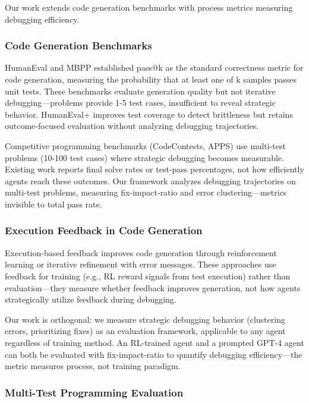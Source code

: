 
Our work extends code generation benchmarks with process metrics measuring debugging efficiency.

\subsubsection{Code Generation Benchmarks}

HumanEval and MBPP established pass@k as the standard correctness metric for code generation, measuring the probability that at least one of k samples passes unit tests. These benchmarks evaluate generation quality but not iterative debugging---problems provide 1-5 test cases, insufficient to reveal strategic behavior. HumanEval+ improves test coverage to detect brittleness but retains outcome-focused evaluation without analyzing debugging trajectories.

Competitive programming benchmarks (CodeContests, APPS) use multi-test problems (10-100 test cases) where strategic debugging becomes measurable. Existing work reports final solve rates or test-pass percentages, not how efficiently agents reach these outcomes. Our framework analyzes debugging trajectories on multi-test problems, measuring fix-impact-ratio and error clustering---metrics invisible to total pass rate.

\subsubsection{Execution Feedback in Code Generation}

Execution-based feedback improves code generation through reinforcement learning or iterative refinement with error messages. These approaches use feedback for training (e.g., RL reward signals from test execution) rather than evaluation---they measure whether feedback improves generation, not how agents strategically utilize feedback during debugging.

Our work is orthogonal: we measure strategic debugging behavior (clustering errors, prioritizing fixes) as an evaluation framework, applicable to any agent regardless of training method. An RL-trained agent and a prompted GPT-4 agent can both be evaluated with fix-impact-ratio to quantify debugging efficiency---the metric measures process, not training paradigm.

\subsubsection{Multi-Test Programming Evaluation}

